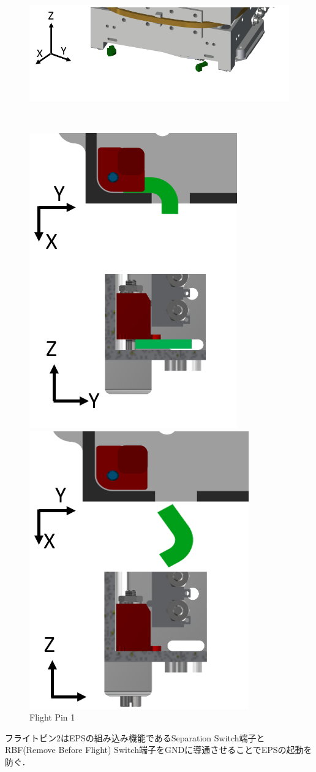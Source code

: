 \begin{figure}[htbp]
	\begin{minipage}{\hsize}
		\centering
		\includegraphics[width=0.5\linewidth]{./03/fig/fpin_a.png}
	\end{minipage}\\
	\begin{minipage}{0.5\hsize}
		\centering
		\includegraphics[height=0.7\linewidth]{./03/fig/fpin_b.png}
	\end{minipage}
	\begin{minipage}{0.5\hsize}
		\centering
		\includegraphics[height=0.7\linewidth]{./03/fig/fpin_c.png}
	\end{minipage}
	\caption{Flight Pin 1}
	\label{fig3-1fpin}
\end{figure}

フライトピン2はEPSの組み込み機能であるSeparation Switch端子とRBF(Remove Before Flight) Switch端子をGNDに導通させることでEPSの起動を防ぐ．

